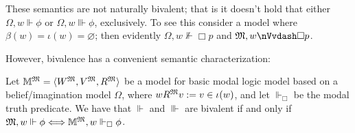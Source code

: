 These semantics are not naturally bivalent; that is it doesn't hold that
either $\Omega, w \Vdash \phi$ or $\Omega, w \Vvdash \phi$, exclusively. To
see this consider a model where $\beta (w) = \iota (w) = \varnothing$; then
evidently $\Omega, w {\nVdash} \Box p$ and $\Omega, w {\nVvdash} \Box p$.

However, bivalence has a convenient semantic characterization:

\begin{proposition}
  \label{biv1}Let $\mathbbm{M}^{\Omega} = \langle W^{\Omega}, V^{\Omega},
  R^{\Omega} \rangle$ be a model for basic modal logic model based on a
  belief/imagination model $\Omega$, where $w R^{\Omega} v \assign v \in \iota
  (w)$, and let $\Vdash_{\Box}$ be the modal truth predicate.   We have that
  $\Vdash$ and $\Vvdash$ are bivalent if and only if $\Omega, w \Vdash \phi
  \Longleftrightarrow \mathbbm{M}^{\Omega}, w \Vdash_{\Box} \phi$.
\end{proposition}

